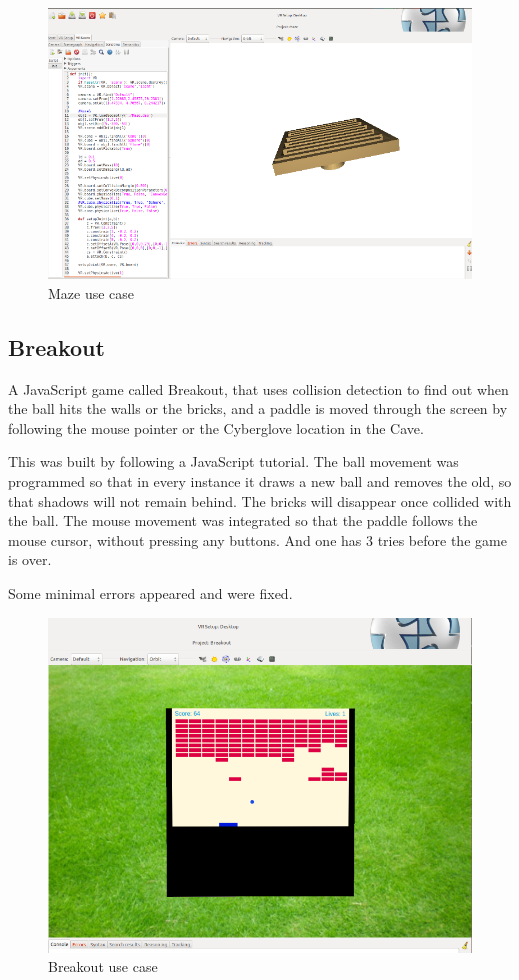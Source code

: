\begin{figure}[!h]
	\centering
	\includegraphics[width=.8\textwidth]{./images/shant/image3.png}
	\caption{Maze use case}
\end{figure}

\subsection{Breakout}

A JavaScript game called Breakout, that uses collision detection to find out when the ball hits the walls or the bricks, and a paddle is moved through the screen by following the mouse pointer or the Cyberglove location in the Cave.

This was built by following a JavaScript tutorial. The ball movement was programmed so that in every instance it draws a new ball and removes the old, so that shadows will not remain behind. The bricks will disappear once collided with the ball. The mouse movement was integrated so that the paddle follows the mouse cursor, without pressing any buttons. And one has 3 tries before the game is over.

Some minimal errors appeared and were fixed.

\begin{figure}[!h]
	\centering
	\includegraphics[width=.7\textwidth]{./images/shant/image4.png}
	\caption{Breakout use case}
\end{figure}

